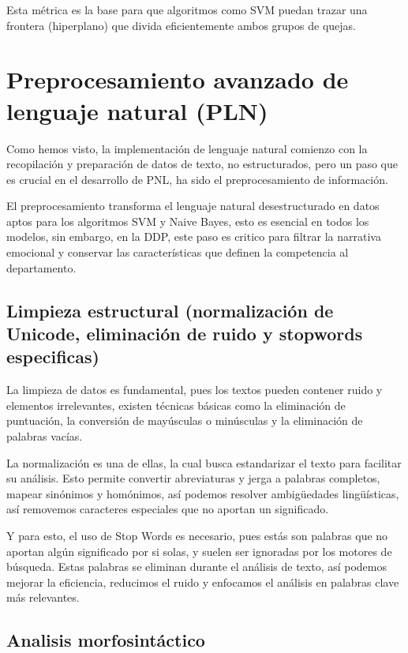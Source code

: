 Esta métrica es la base para que algoritmos como SVM puedan trazar una frontera (hiperplano) que divida eficientemente ambos grupos de quejas.

\section{Preprocesamiento avanzado de lenguaje natural (PLN)}

Como hemos visto, la implementación de lenguaje natural comienzo con la recopilación y preparación de datos de texto, no estructurados, pero un paso que es crucial en el desarrollo de PNL, ha sido el preprocesamiento de información.

El preprocesamiento transforma el lenguaje natural desestructurado en datos aptos para los algoritmos SVM y Naive Bayes, esto es esencial en todos los modelos, sin embargo, en la DDP, este paso es critico para filtrar la narrativa emocional y conservar las características que definen la competencia al departamento.

\subsection{Limpieza estructural (normalización de Unicode, eliminación de ruido y stopwords especificas)}

La limpieza de datos es fundamental, pues los textos pueden contener ruido y elementos irrelevantes, existen técnicas básicas como la eliminación de puntuación, la conversión de mayúsculas o minúsculas y la eliminación de palabras vacías.

La normalización es una de ellas, la cual busca estandarizar el texto para facilitar su análisis. Esto permite convertir abreviaturas y jerga a palabras completos, mapear sinónimos y homónimos, así podemos resolver ambigüedades lingüísticas, así removemos caracteres especiales que no aportan un significado.

Y para esto, el uso de Stop Words es necesario, pues estás son palabras que no aportan algún significado por si solas, y suelen ser ignoradas por los motores de búsqueda. Estas palabras se eliminan durante el análisis de texto, así podemos mejorar la eficiencia, reducimos el ruido y enfocamos el análisis en palabras clave más relevantes.

\subsection{Analisis morfosintáctico}

